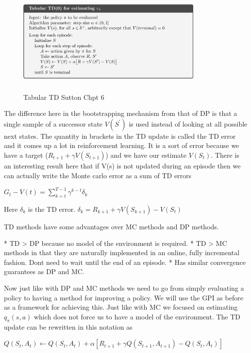 \begin{figure}[H]
        \centering
        \includegraphics[width=350px,height=200px]{images/tabular_0.png}
        \caption{Tabular TD Sutton Chpt 6}
        \label{fig:my_label}
    \end{figure}
    

The difference here in the bootstrapping mechanism from that of DP is that a single sample of a successor state $V(S^{'})$ is used instead of looking at all possible next states. The quantity in brackets in the TD update is called the TD error and it comes up a lot in reinforcement learning. It is a sort of error because we have a target ($R_{t + 1} + \gamma V(S_{t + 1})$) and we have our estimate $V(S_{t})$. There is an interesting result here that if V(s) is not updated during an episode then we can actually write the Monte carlo error as a sum of TD errors

$G_{t} - V(t) = \sum_{k=t}^{T - 1} \gamma^{k - t}\delta_{k}$

Here $\delta_{k}$ is the TD error. $\delta_{k} = R_{k + 1} + \gamma V(S_{k + 1}) - V(S_{t})$

TD methods have some advantages over MC methods and DP methods. 

* TD > DP because no model of the environment is required. 
* TD > MC methods in that they are naturally implemented in an online, fully incremental fashion. Dont need to wait until the end of an episode. 
* Has similar convergence guarantees as DP and MC. 

Now just like with DP and MC methods we need to go from simply evaluating a policy to having a method for improving a policy. We will use the GPI as before as a framework for achieving this. Just like with MC we focused on estimating $q_{\pi} (s,a)$ which does not force us to have a model of the environment. The TD update can be rewritten in this notation as 

$ Q(S_{t}, A_{t}) \leftarrow Q(S_{t},A_{t}) + \alpha[R_{t + 1} + \gamma Q(S_{t + 1},A_{t + 1}) - Q(S_{t},A_{t})]$

